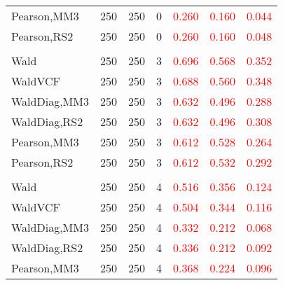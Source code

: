 \documentclass[
]{article}
\begin{document}
\begin{table}[H]
{\begin{tabular}[t]{lrrrrrr}
\hspace{1em}Pearson,MM3 & 250 & 250 & 0 & \textcolor{red}{0.260} & \textcolor{red}{0.160} & \textcolor{red}{0.044}\\
\hspace{1em}Pearson,RS2 & 250 & 250 & 0 & \textcolor{red}{0.260} & \textcolor{red}{0.160} & \textcolor{red}{0.048}\\
\addlinespace[0.3em]
\multicolumn{7}{l}{\textbf{1F 15V}}\\
\hspace{1em}Wald & 250 & 250 & 3 & \textcolor{red}{0.696} & \textcolor{red}{0.568} & \textcolor{red}{0.352}\\
\hspace{1em}WaldVCF & 250 & 250 & 3 & \textcolor{red}{0.688} & \textcolor{red}{0.560} & \textcolor{red}{0.348}\\
\hspace{1em}WaldDiag,MM3 & 250 & 250 & 3 & \textcolor{red}{0.632} & \textcolor{red}{0.496} & \textcolor{red}{0.288}\\
\hspace{1em}WaldDiag,RS2 & 250 & 250 & 3 & \textcolor{red}{0.632} & \textcolor{red}{0.496} & \textcolor{red}{0.308}\\
\hspace{1em}Pearson,MM3 & 250 & 250 & 3 & \textcolor{red}{0.612} & \textcolor{red}{0.528} & \textcolor{red}{0.264}\\
\hspace{1em}Pearson,RS2 & 250 & 250 & 3 & \textcolor{red}{0.612} & \textcolor{red}{0.532} & \textcolor{red}{0.292}\\
\addlinespace[0.3em]
\multicolumn{7}{l}{\textbf{2F 10V}}\\
\hspace{1em}Wald & 250 & 250 & 4 & \textcolor{red}{0.516} & \textcolor{red}{0.356} & \textcolor{red}{0.124}\\
\hspace{1em}WaldVCF & 250 & 250 & 4 & \textcolor{red}{0.504} & \textcolor{red}{0.344} & \textcolor{red}{0.116}\\
\hspace{1em}WaldDiag,MM3 & 250 & 250 & 4 & \textcolor{red}{0.332} & \textcolor{red}{0.212} & \textcolor{red}{0.068}\\
\hspace{1em}WaldDiag,RS2 & 250 & 250 & 4 & \textcolor{red}{0.336} & \textcolor{red}{0.212} & \textcolor{red}{0.092}\\
\hspace{1em}Pearson,MM3 & 250 & 250 & 4 & \textcolor{red}{0.368} & \textcolor{red}{0.224} & \textcolor{red}{0.096}\\

\end{tabular}}
\end{table}
\end{document}
